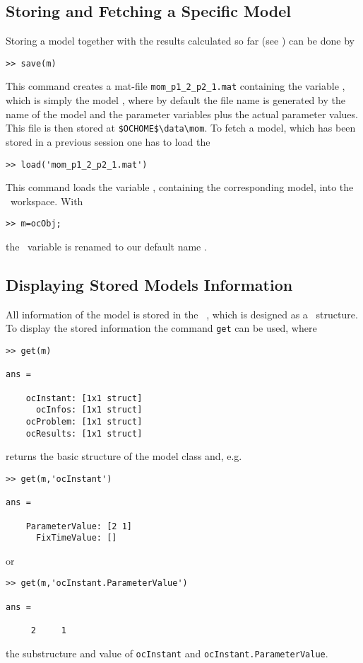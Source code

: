 \subsection{Storing and Fetching a Specific Model}
Storing a model together with the results calculated so far (see ) can be done by
\begin{lstlisting}
>> save(m)
\end{lstlisting}
This command creates a mat-file \lstinline+mom_p1_2_p2_1.mat+ containing the variable \ocObj, which is simply the model \ocvar, where by default the file name is generated by the name of the model and the parameter variables plus the actual parameter values. This file is then stored at \lstinline+$OCHOME$\data\mom+. To fetch a model, which has been stored in a previous session one has to load the \matfile
\begin{lstlisting}
>> load('mom_p1_2_p2_1.mat')
\end{lstlisting}
This command loads the variable \ocObj, containing the corresponding model, into the \MATL\ workspace. With
\begin{lstlisting}
>> m=ocObj;
\end{lstlisting}
the \optdyn\ variable is renamed to our default name \ocvar.
 
\subsection{Displaying Stored Models Information}
All information of the model is stored in the \ocmodel\ \ocvar, which is designed as a \MATL\ structure. To display the stored information the command \lstinline+get+ can be used, where
\begin{lstlisting}
>> get(m)

ans = 

    ocInstant: [1x1 struct]
      ocInfos: [1x1 struct]
    ocProblem: [1x1 struct]
    ocResults: [1x1 struct]
\end{lstlisting}
returns the basic structure of the model class and, e.g.
\begin{lstlisting}
>> get(m,'ocInstant')

ans = 

    ParameterValue: [2 1]
      FixTimeValue: []
\end{lstlisting}
or
\begin{lstlisting}
>> get(m,'ocInstant.ParameterValue')

ans =

     2     1
\end{lstlisting}
the substructure and value of \lstinline+ocInstant+ and \lstinline+ocInstant.ParameterValue+. 

